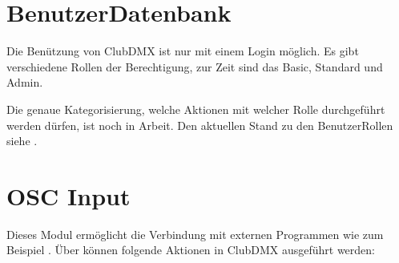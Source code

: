 \documentclass[letterpaper,10pt,ngerman]{sphinxmanual}
\begin{document}
\section{Benutzer\sphinxhyphen{}Datenbank}
\label{\detokenize{navigation:benutzer-datenbank}}
Die Benützung von ClubDMX ist nur mit einem Login möglich.
Es gibt verschiedene Rollen der Berechtigung, zur Zeit sind das
Basic, Standard und Admin.

Die genaue Kategorisierung, welche Aktionen mit welcher Rolle
durchgeführt werden dürfen, ist noch in Arbeit. Den aktuellen Stand zu den
Benutzer\sphinxhyphen{}Rollen siehe {\hyperref[\detokenize{benutzer:benutzer-label}]{}} .


\section{OSC Input}
\label{\detokenize{navigation:osc-input}}
Dieses Modul ermöglicht die Verbindung mit externen Programmen wie zum Beispiel
 . Über
 können
folgende Aktionen in ClubDMX ausgeführt werden:
\end{document}
